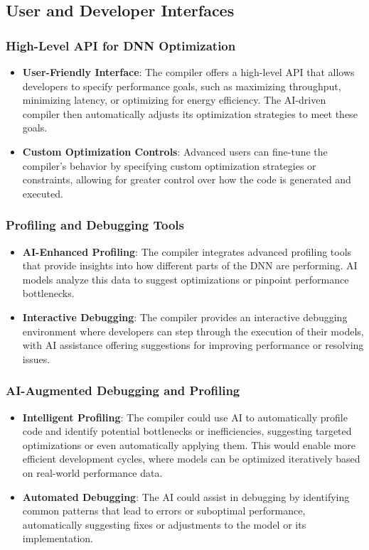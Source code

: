 \documentclass{article}
\begin{document}
\subsection{User and Developer Interfaces}

\subsubsection{High-Level API for DNN Optimization}
\begin{itemize}
    \item \textbf{User-Friendly Interface}: The compiler offers a high-level API that allows developers to specify performance goals, such as maximizing throughput, minimizing latency, or optimizing for energy efficiency. The AI-driven compiler then automatically adjusts its optimization strategies to meet these goals.
    \item \textbf{Custom Optimization Controls}: Advanced users can fine-tune the compiler’s behavior by specifying custom optimization strategies or constraints, allowing for greater control over how the code is generated and executed.
\end{itemize}

\subsubsection{Profiling and Debugging Tools}
\begin{itemize}
    \item \textbf{AI-Enhanced Profiling}: The compiler integrates advanced profiling tools that provide insights into how different parts of the DNN are performing. AI models analyze this data to suggest optimizations or pinpoint performance bottlenecks.
    \item \textbf{Interactive Debugging}: The compiler provides an interactive debugging environment where developers can step through the execution of their models, with AI assistance offering suggestions for improving performance or resolving issues.
\end{itemize}

\subsubsection{AI-Augmented Debugging and Profiling}
\begin{itemize}
    \item \textbf{Intelligent Profiling}: The compiler could use AI to automatically profile code and identify potential bottlenecks or inefficiencies, suggesting targeted optimizations or even automatically applying them. This would enable more efficient development cycles, where models can be optimized iteratively based on real-world performance data.
    \item \textbf{Automated Debugging}: The AI could assist in debugging by identifying common patterns that lead to errors or suboptimal performance, automatically suggesting fixes or adjustments to the model or its implementation.
\end{itemize}
\end{document}
